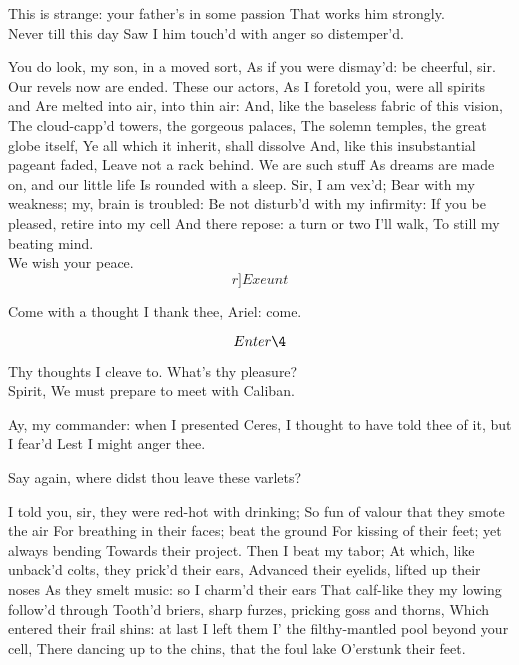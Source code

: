 \documentclass[11pt]{book}
\begin{document}
\3	This is strange: your father's in some passion
	That works him strongly. \\

\2	Never till this day
	Saw I him touch'd with anger so distemper'd.

\1	You do look, my son, in a moved sort,
	As if you were dismay'd: be cheerful, sir.
	Our revels now are ended. These our actors,
	As I foretold you, were all spirits and
	Are melted into air, into thin air:
	And, like the baseless fabric of this vision,
	The cloud-capp'd towers, the gorgeous palaces,
	The solemn temples, the great globe itself,
	Ye all which it inherit, shall dissolve
	And, like this insubstantial pageant faded,
	Leave not a rack behind. We are such stuff
	As dreams are made on, and our little life
	Is rounded with a sleep. Sir, I am vex'd;
	Bear with my weakness; my, brain is troubled:
	Be not disturb'd with my infirmity:
	If you be pleased, retire into my cell
	And there repose: a turn or two I'll walk,
	To still my beating mind. \\


 We wish your peace. \[r]Exeunt\]

\1	Come with a thought I thank thee, Ariel: come.

	\[Enter \4\]

\4	Thy thoughts I cleave to. What's thy pleasure? \\

\1	Spirit,
	We must prepare to meet with Caliban.

\4	Ay, my commander: when I presented Ceres,
	I thought to have told thee of it, but I fear'd
	Lest I might anger thee. 

\1	Say again, where didst thou leave these varlets?

\4	I told you, sir, they were red-hot with drinking;
	So fun of valour that they smote the air
	For breathing in their faces; beat the ground
	For kissing of their feet; yet always bending
	Towards their project. Then I beat my tabor;
	At which, like unback'd colts, they prick'd 	their ears,
	Advanced their eyelids, lifted up their noses
	As they smelt music: so I charm'd their ears
	That calf-like they my lowing follow'd through
	Tooth'd briers, sharp furzes, pricking goss and thorns,
	Which entered their frail shins: at last I left them
	I' the filthy-mantled pool beyond your cell,
	There dancing up to the chins, that the foul lake
	O'erstunk their feet. \\
\end{document}

